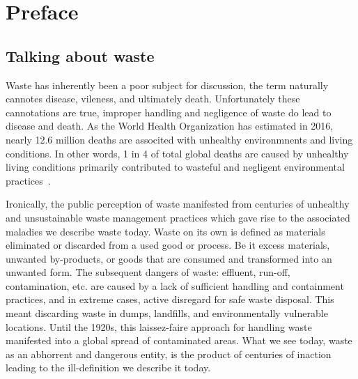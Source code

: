 \documentclass[../main/main]{subfiles}
\begin{document}
\renewcommand{\thefigure}{\Roman{chapter}.\Roman{figure}}
\renewcommand{\thetable}{\Roman{chapter}.\Roman{table}}

\renewcommand{\thechapter}{\Roman{chapter}}
\renewcommand{\thesection}{\Roman{chapter}.\Roman{section}}
\renewcommand{\thesubsection}{\Roman{chapter}.\Roman{section}.\Roman{subsection}}

\chapter{Preface}
\section{Talking about waste}
Waste has inherently been a poor subject for discussion, the term naturally cannotes disease, vileness, and ultimately death. Unfortunately these cannotations are true, improper handling and negligence of waste do lead to disease and death. As the World Health Organization has estimated in 2016, nearly 12.6 million deaths are associted with unhealthy environmnents and living conditions. In other words, 1 in 4 of total global deaths are caused by unhealthy living conditions primarily contributed to wasteful and negligent environmental practices~\cite{who2016}.

Ironically, the public perception of waste manifested from centuries of unhealthy and unsustainable waste management practices which gave rise to the associated maladies we describe waste today. Waste on its own is defined as materials eliminated or discarded from a used good or process. Be it excess materials, unwanted by-products, or goods that are consumed and transformed into an unwanted form. The subsequent dangers of waste: effluent, run-off, contamination, etc. are caused by a lack of sufficient handling and containment practices, and in extreme cases, active disregard for safe waste disposal. This meant discarding waste in dumps, landfills, and environmentally vulnerable locations. Until the 1920s, this laissez-faire approach for handling waste manifested into a global spread of contaminated areas. What we see today, waste as an abhorrent and dangerous entity, is the product of centuries of inaction leading to the ill-definition we describe it today.
\end{document}
